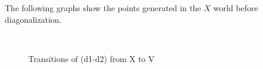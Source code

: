 \documentclass[11pt, oneside]{article}   	%
\begin{document}
The following graphs show the points generated in the $X$ world before diagonalization.
\newpage
\begin{figure}
\begin{center}
	\\
\end{center}
\caption{Transitions of (d1-d2) from X to V}
\end{figure}
\end{document}
